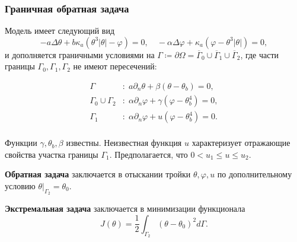 \begin{frame}
    \frametitle{Граничная обратная задача}
    Модель имеет следующий вид
    \begin{equation}
        \label{eq:2_1:initial}
        - a \Delta \theta + b \kappa_a(\theta ^ 3 | \theta | - \varphi) = 0,  \quad
        - \alpha \Delta \varphi + \kappa_a (\varphi - \theta ^3 | \theta |) = 0,
    \end{equation}
    и дополняется граничными условиями на
    $\Gamma \coloneqq \partial \Omega =\overline{\Gamma}_0 \cup \overline{\Gamma}_1 \cup \overline{\Gamma}_2$,
    где части границы $\Gamma_0, \Gamma_1, \Gamma_2$ не имеют пересечений:

    \begin{equation}
        \label{eq:2_1:initial-boundary}
        \begin{aligned}
            \Gamma &: \; a \partial_n \theta + \beta (\theta - \theta _b) = 0, \\
            \Gamma_0 \cup \Gamma_2 &: \; \alpha \partial_n \varphi
            + \gamma(\varphi - \theta_b ^4 ) = 0, \\
            \Gamma_1 &: \; \alpha \partial_n \varphi + u(\varphi - \theta_b ^4 ) = 0. \\
        \end{aligned}
    \end{equation}

    Функции $\gamma, \theta_b, \beta$ известны.
    Неизвестная функция $u$ характеризует отражающие свойства участка границы $\Gamma_1$.
    Предполагается, что $0 < u_1 \leq u \leq u_2$.

    \textbf{Обратная задача} заключается в отыскании тройки $\theta, \varphi, u$
    по дополнительному условию $\theta|_{\Gamma_2} = \theta_0$.

    \textbf{Экстремальная задача} заключается в минимизации функционала
    \[ J(\theta) = \frac{1}{2} \int_{\Gamma_2} (\theta - \theta_0)^2 d\Gamma. \]
\end{frame}

